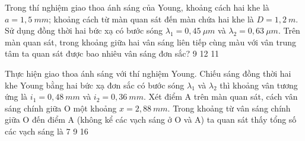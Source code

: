 \begin{ex}
Trong thí nghiệm giao thoa ánh sáng của Young, khoảng cách hai khe là $a = 1,5\ mm$; khoảng cách từ màn quan sát đến màn chứa hai khe là $D = 1,2\ m$. Sử dụng đồng thời hai bức xạ có bước sóng $\lambda_1 = 0,45\ \mu m$ và $\lambda_2 = 0,63\ \mu m$. Trên màn quan sát, trong khoảng giữa hai vân sáng liên tiếp cùng màu với vân trung tâm ta quan sát được bao nhiêu vân sáng đơn sắc?
\choice
{9}
{12}
{}
{11}
\loigiai{ }
\end{ex}
\begin{ex}%
Thực hiện giao thoa ánh sáng với thí nghiệm Young. Chiếu sáng đồng thời hai khe Young bằng hai bức xạ đơn sắc có bước sóng $\lambda _1$ và $\lambda _2$ thì khoảng vân tương ứng là $i_1=0,48\ mm$ và $i_2=0,36\ mm$. Xét điểm A trên màn quan sát, cách vân sáng chính giữa O một khoảng $x=2,88\ mm$. Trong khoảng từ vân sáng chính giữa O đến điểm A (không kể các vạch sáng ở O và A) ta quan sát thấy tổng số các vạch sáng là
\choice
{7}
{9}
{16}
{}
\end{ex} 

